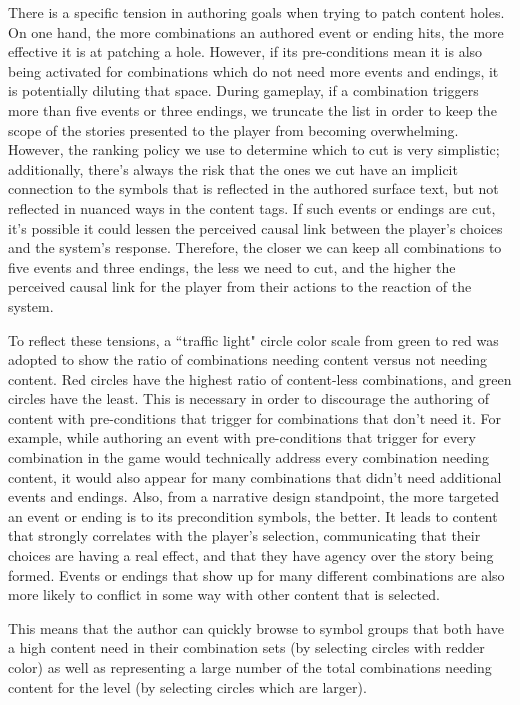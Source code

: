 There is a specific tension in authoring goals when trying to patch content holes. On one hand, the more combinations an authored event or ending hits, the more effective it is at patching a hole. However, if its pre-conditions mean it is also being activated for combinations which do not need more events and endings, it is potentially diluting that space. During gameplay, if a combination triggers more than five events or three endings, we truncate the list in order to keep the scope of the stories presented to the player from becoming overwhelming. However, the ranking policy we use to determine which to cut is very simplistic; additionally, there's always the risk that the ones we cut have an implicit connection to the symbols that is reflected in the authored surface text, but not reflected in nuanced ways in the content tags. If such events or endings are cut, it's possible it could lessen the perceived causal link between the player's choices and the system's response. Therefore, the closer we can keep all combinations to five events and three endings, the less we need to cut, and the higher the perceived causal link for the player from their actions to the reaction of the system.

To reflect these tensions, a ``traffic light" circle color scale from green to red was adopted to show the ratio of combinations needing content versus not needing content. Red circles have the highest ratio of content-less combinations, and green circles have the least. This is necessary in order to discourage the authoring of content with pre-conditions that trigger for combinations that don't need it. For example, while authoring an event with pre-conditions that trigger for every combination in the game would technically address every combination needing content, it would also appear for many combinations that didn't need additional events and endings. Also, from a narrative design standpoint, the more targeted an event or ending is to its precondition symbols, the better. It leads to content that strongly correlates with the player's selection, communicating that their choices are having a real effect, and that they have agency over the story being formed. Events or endings that show up for many different combinations are also more likely to conflict in some way with other content that is selected.

This means that the author can quickly browse to symbol groups that both have a high content need in their combination sets (by selecting circles with redder color) as well as representing a large number of the total combinations needing content for the level (by selecting circles which are larger).

